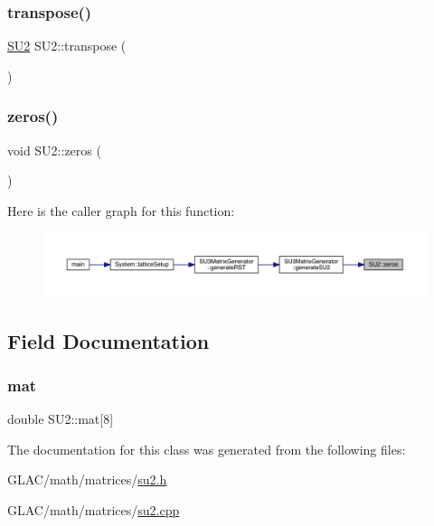 \subsubsection{\texorpdfstring{transpose()}{transpose()}}
{\footnotesize\ttfamily \mbox{\hyperlink{class_s_u2}{S\+U2}} S\+U2\+::transpose (\begin{DoxyParamCaption}{ }\end{DoxyParamCaption})}

\mbox{\label{class_s_u2_a348ca5d38346892060a05f7d9de02916}} 
\subsubsection{\texorpdfstring{zeros()}{zeros()}}
{\footnotesize\ttfamily void S\+U2\+::zeros (\begin{DoxyParamCaption}{ }\end{DoxyParamCaption})\hspace{0.3cm}{\ttfamily [inline]}}

Here is the caller graph for this function\+:
\nopagebreak
\begin{figure}[H]
\begin{center}
\leavevmode
\includegraphics[width=350pt]{class_s_u2_a348ca5d38346892060a05f7d9de02916_icgraph}
\end{center}
\end{figure}


\subsection{Field Documentation}
\mbox{\label{class_s_u2_ad4227484be245b63489c44a2bc02a625}} 
\subsubsection{\texorpdfstring{mat}{mat}}
{\footnotesize\ttfamily double S\+U2\+::mat\mbox{[}8\mbox{]}}



The documentation for this class was generated from the following files\+:\begin{DoxyCompactItemize}
\item 
G\+L\+A\+C/math/matrices/\mbox{\hyperlink{su2_8h}{su2.\+h}}\item 
G\+L\+A\+C/math/matrices/\mbox{\hyperlink{su2_8cpp}{su2.\+cpp}}\end{DoxyCompactItemize}

